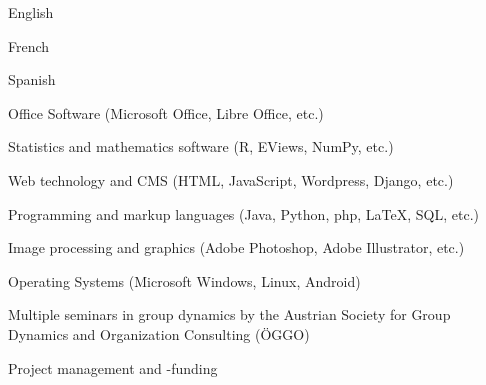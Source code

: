 


{\begin{cvenumerate}
		\item English 
		\item French 
		\item Spanish 
	\end{cvenumerate}}

%

	{\begin{cvenumerate}
		\item Office Software (Microsoft Office, Libre Office, etc.) 
		\item Statistics and mathematics software (R, EViews, NumPy, etc.) 
		\item Web technology and CMS (HTML, JavaScript, Wordpress, Django, etc.) 
		\item Programming and markup languages (Java, Python, php, LaTeX, SQL, etc.) 
		\item Image processing and graphics (Adobe Photoshop, Adobe Illustrator, etc.) 
		\item Operating Systems (Microsoft Windows, Linux, Android) 
	\end{cvenumerate}}

	{\begin{cvenumerate}
		\item Multiple seminars in group dynamics by the Austrian Society for Group Dynamics and Organization Consulting (ÖGGO)
		\item Project management and -funding
	\end{cvenumerate}}

